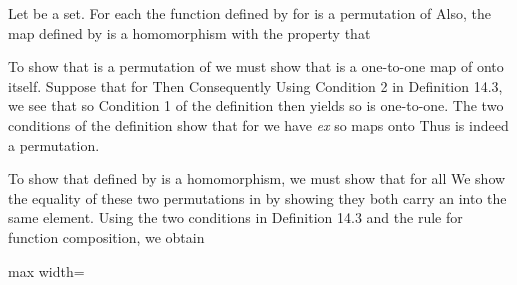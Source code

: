 \documentclass[11pt,oneside]{article}
\begin{document}
\begin{BookBody}
\end{BookBody}

\BookNarrativetrue

\begin{BookBody}

 Let  be a set. For each  the function  defined by  for  is a permutation of  Also, the map  defined by  is a homomorphism with the property that 

 To show that  is a permutation of  we must show that  is a one-to-one map of  onto itself. Suppose that  for  Then  Consequently Using Condition 2 in Definition 14.3, we see that  so  Condition 1 of the definition then yields  so  is one-to-one. The two conditions of the definition show that for  we have  \textit{ex}  so  maps  onto  Thus  is indeed a permutation.

To show that  defined by  is a homomorphism, we must show that  for all  We show the equality of these two permutations in  by showing they both carry an  into the same element. Using the two conditions in Definition 14.3 and the rule for function composition, we obtain

\begin{center}\begin{adjustbox}{max width=\linewidth}\end{adjustbox}\end{center}


\end{BookBody}
\end{document}
